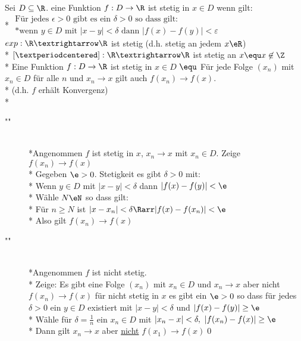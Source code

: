 \wdh
Sei $D \subseteq \R$. eine Funktion $f: D \to \R$ ist stetig in $x \in D$ wenn gilt:\\*
$\begin{array}{ll}
\text{Für jedes $\epsilon > 0$ gibt es ein $\delta > 0$ so dass gilt:}\\*
\text{wenn $y \in D$ mit $|x - y| < \delta$ dann $|f(x) - f(y)| < ε$}
\end{array}$
\bsp
$exp:\R→\R$ ist stetig (d.h. stetig an jedem $x\eR$)\\*
$[·]:\R→\R$ ist stetig an $x \equ x\not\in\Z$\\*
Eine Funktion $f: D \to \R$ ist stetig in $x \in D$ $\equ$ Für jede Folge $(x_n)$ mit $x_n \in D$ für alle $n$ und $x_n \to x$ gilt auch $f(x_n) \to f(x)$.\\*
(d.h. $f$ erhält Konvergenz)\\*
\bew
\begin{description}
\item["\Rarr"]{\\*Angenommen $f$ ist stetig in $x$, $x_n→x$ mit $x_n\in D$. Zeige $f(x_n)→f(x)$\\*
Gegeben $\e>0$. Stetigkeit \Rarr{} es gibt $\delta>0$ mit:\\*
Wenn $y\in D$ mit $|x-y|<\delta$ dann $|f(x)-f(y)|<\e$\\*
Wähle $N\eN$ so dass gilt:\\*
Für $n\geq N$ ist $|x-x_n|<\delta \Rarr |f(x)-f(x_n)|<\e$\\*
Also gilt $f(x_n)→f(x)$}
\item["\Larr"]{\\*Angenommen $f$ ist nicht stetig.\\*
Zeige: Es gibt eine Folge $(x_n)$ mit $x_n\in D$ und $x_n→x$ aber nicht $f(x_n)→f(x)$ für nicht stetig in $x$ \Rarr{} es gibt ein $\e>0$ so dass für jedes $\delta>0$ ein $y\in D$ existiert mit $|x-y|<\delta$ und $|f(x)-f(y)|\geq \e$\\*
Wähle für $\delta=\frac{1}{n}$ ein $x_n\in D$ mit $|x_n-x|<\delta,\ |f(x_n)-f(x)|\geq\e$\\*
Dann gilt $x_n→x$ aber \ul{nicht} $f(x_1)→f(x)$\qed}
\end{description}

